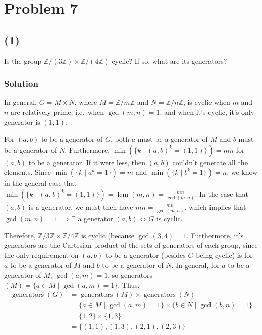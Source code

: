 \documentclass[fleqn]{article}
\DeclareMathOperator{\lcm}{lcm}
\DeclareMathOperator{\generators}{generators}
\begin{document}
    \section{Problem 7}
        
        \subsection{(1)}
        Is the group $\mathbb{Z}/(3 \mathbb{Z}) \times \mathbb{Z}/(4 \mathbb{Z})$ cyclic?  If so, what are its generators?
            
            \subsubsection{Solution}
            In general, $G = M \times N$, where $M = \mathbb{Z}/m\mathbb{Z}$ and $N = \mathbb{Z}/n\mathbb{Z}$, is cyclic when $m$ and $n$ are relatively prime, i.e.\ when $\gcd(m, n) = 1$, and when it's cyclic, it's only generator is $(1, 1)$.
            
            For $(a, b)$ to be a generator of $G$, both $a$ must be a generator of $M$ and $b$ must be a generator of $N$.  Furthermore, $\min(\{k \mid (a, b)^k = (1, 1)\}) = mn$ for $(a, b)$ to be a generator.  If it were less, then $(a, b)$ couldn't generate all the elements.  Since $\min(\{k \mid a^k = 1\}) = m$ and $\min(\{k \mid b^k = 1\}) = n$, we know in the general case that $\min(\{k \mid (a, b)^k = (1, 1)\}) = \lcm(m, n) = \frac{mn}{\gcd(m, n)}$.  In the case that $(a, b)$ is a generator, we must then have $mn = \frac{mn}{\gcd(m, n)}$, which implies that $\gcd(m, n) = 1 \implies \exists$ a generator $(a, b) \iff G$ is cyclic.
            
            Therefore, $\mathbb{Z}/3\mathbb{Z} \times \mathbb{Z}/4\mathbb{Z}$ is cyclic (because $\gcd(3, 4) = 1$.  Furthermore, it's generators are the Cartesian product of the sets of generators of each group, since the only requirement on $(a, b)$ to be a generator (besides $G$ being cyclic) is for $a$ to be a generator of $M$ and $b$ to be a generator of $N$.  In general, for $a$ to be a generator of $M$, $\gcd(a, m) = 1$, so generators$(M) = \{a \in M \mid \gcd(a, m) = 1\}$.  Thus, 
            \begin{align}
                \generators(G) &= \generators(M) \times \generators(N) \\
                &= \{a \in M \mid \gcd(a, m) = 1\} \times \{b \in N \mid \gcd(b, n) = 1\} \\
                &= \{1, 2\} \times \{1, 3\} \\
                &= \{(1, 1), (1, 3), (2, 1), (2, 3)\}
            \end{align}
            
\end{document}
